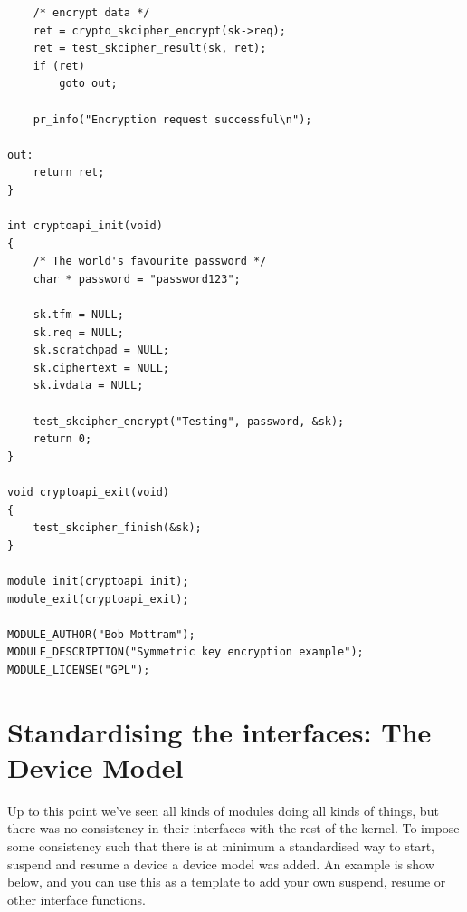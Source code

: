 \documentclass[11pt]{article}
\begin{document}
\begin{verbatim}
    /* encrypt data */
    ret = crypto_skcipher_encrypt(sk->req);
    ret = test_skcipher_result(sk, ret);
    if (ret)
        goto out;

    pr_info("Encryption request successful\n");

out:
    return ret;
}

int cryptoapi_init(void)
{
    /* The world's favourite password */
    char * password = "password123";

    sk.tfm = NULL;
    sk.req = NULL;
    sk.scratchpad = NULL;
    sk.ciphertext = NULL;
    sk.ivdata = NULL;

    test_skcipher_encrypt("Testing", password, &sk);
    return 0;
}

void cryptoapi_exit(void)
{
    test_skcipher_finish(&sk);
}

module_init(cryptoapi_init);
module_exit(cryptoapi_exit);

MODULE_AUTHOR("Bob Mottram");
MODULE_DESCRIPTION("Symmetric key encryption example");
MODULE_LICENSE("GPL");
\end{verbatim}
\section*{Standardising the interfaces: The Device Model}
\label{sec-17}
Up to this point we've seen all kinds of modules doing all kinds of things, but there was no consistency in their interfaces with the rest of the kernel. To impose some consistency such that there is at minimum a standardised way to start, suspend and resume a device a device model was added. An example is show below, and you can use this as a template to add your own suspend, resume or other interface functions.
\end{document}
